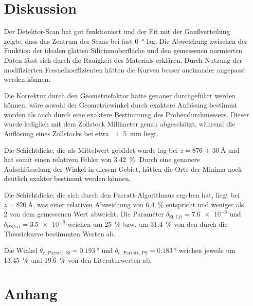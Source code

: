 \section{Diskussion}
\label{sec:Diskussion}

Der Detektor-Scan hat gut funktioniert und der Fit mit der Gaußverteilung zeigte, dass das Zentrum des Scans bei fast \SI{0}{\degree} lag. 
Die Abweichung zwischen der Funktion der idealen glatten Siliciumoberfläche und den gemessenen normierten Daten lässt sich durch die Rauigkeit des Materials erklären. Durch Nutzung der modifizierten Fresnelkoeffizienten hätten die Kurven besser aneinander angepasst werden können. 

Die Korrektur durch den Geometriefaktor hätte genauer durchgeführt werden können, wäre sowohl der Geometriewinkel durch exaktere Auflösung bestimmt worden als auch durch eine exaktere Bestimmung des Probendurchmessers. Dieser wurde lediglich mit dem Zollstock Millimeter genau abgeschätzt, während die Auflösung eines Zollstocks bei etwa \SI{\pm5}{\milli\meter} liegt.

Die Schichtdicke, die als Mittelwert gebildet wurde lag bei $z = \SI{876(30)}{\angstrom}$ und hat somit einen relativen Fehler von \SI{3.42}{\percent}. Durch eine genauere Aufschlüsselung der Winkel in diesem Gebiet, hätten die Orte der Minima noch deutlich exakter bestimmt werden können. 

Die Schichtdicke, die sich durch den Parratt-Algorithmus ergeben hat, liegt bei $z = \SI{820}{\angstrom}$, was einer relativen Abweichung von \SI{6.4}{\percent} entspricht und weniger als \SI{2}{\sigma} von dem gemessenen Wert abweicht.
Die Parameter $\delta_\text{Si, Lit}= \num{7.6e-6}$ und $\delta_\text{PS,Lit}=\num{3.5e-6}$ weichen um \SI{25}{\percent} bzw. um \SI{31.4}{\percent} von den durch die Theoriekurve bestimmten Werten ab. 

Die Winkel $\theta_\text{c, Parratt, Si}= \SI{0.193}{\degree}$ und $\theta_\text{c, Parratt, PS}= \SI{0.183}{\degree}$ weichen jeweils um \SI{13.45}{\percent} und \SI{19.6}{\percent} von den Literaturwerten ab. 

\newpage
\section{Anhang}


